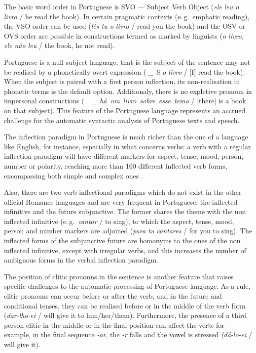 \begin{multicols}{2}
The basic word order in Portuguese is SVO — Subject Verb Object (\textit{ele leu o livro} / he read the book). 
In certain pragmatic contexts (e.\,g.~emphatic reading), the VSO order can be used (\textit{lês tu o livro} / read you the book) 
and the OSV or OVS order are possible in constructions termed as marked by linguists (\textit{o livro, ele não leu} / the book, he not read).

Portuguese is a null subject language, that is the subject of the sentence may not be realised by a phonetically overt 
expression (\textit{ \_ li o livro} / [I] read the book). 
When the subject is paired with a first person inflection, its non-realisation in phonetic terms is the default option. 
Additionaly, there is no expletive pronoun in impersonal constructions (\mbox{ \textit{\ \_ há um livro sobre esse tema}} / [there] is a book on that subject).
This feature of the Portuguese language represents an accrued challenge for the automatic syntactic analysis of Portuguese texts and speech.

The inflection paradigm in Portuguese is much richer than the one of a language like English, for instance, especially in what concerns verbs: 
a verb with a regular inflection paradigm will have different markers for aspect, tense, mood, person, number or polarity, 
reaching more than 160 different inflected verb forms, encompassing both simple and complex ones \cite{branco}.


Also, there are two verb inflectional paradigms which do not exist in the other official Romance languages and 
are very frequent in Portuguese: the inflected infinitive and the future subjunctive.  
The former shares the theme with the non inflected infinitive (e.\,g.~\textit{cantar} / to sing), to which the aspect, tense, mood, person and number markers are 
adjoined (\textit{para tu cantares} / for you to sing). 
The inflected forms of the subjunctive future are homonyms to the ones of the non inflected infinitive, 
except with irregular verbs, and this increases the number of ambiguous forms in the verbal inflection paradigm.

The position of clitic pronouns in the sentence is another feature that raises specific challenges to the automatic processing of Portuguese language. 
As a rule, clitic pronouns can occur before or after the verb, 
and in the future and conditional tenses, they can be realised before or in the middle of the verb form 
(\textit{dar-lho-ei} / will give it to him/her/them). 
Furthermore, the presence of a third person clitic in the middle or in the final position can affect the verb: 
for example, in the final sequence \textit{-ar}, the \textit{-r} falls and the vowel is stressed \textit{(dá-lo-ei} / will give it).


\end{multicols}
